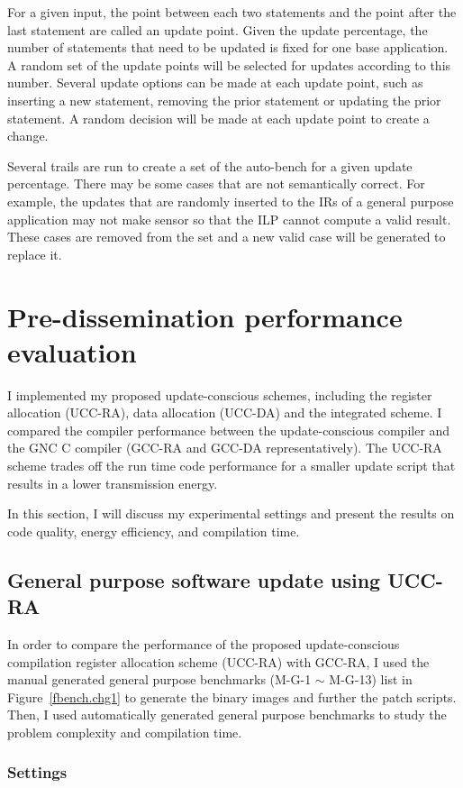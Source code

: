 For a given input, the point between each two statements and the point after the last statement are called an update 
point.
Given the update percentage, the number of statements that need to be updated is fixed
for one base application.
A random set of the update points will be selected for updates according to this number.
Several update options can be made at each update point, such as inserting a new statement,
removing the prior statement or updating the prior statement.
A random decision will be made at each update point to create a change.

Several trails are run to create a set of the auto-bench for a given update percentage.
There may be some cases that are not semantically correct.
For example, the updates that are randomly inserted to the IRs of a general purpose
application may not make sensor so that the ILP cannot compute a valid result.
These cases are removed from the set and a new valid case will be generated to replace it.

\section{Pre-dissemination performance evaluation}
I implemented my proposed update-conscious schemes, including the register allocation
(UCC-RA), data allocation (UCC-DA) and the integrated scheme.
I compared the compiler performance between the update-conscious compiler and 
the GNC C compiler (GCC-RA and GCC-DA representatively). 
The UCC-RA scheme trades off the run time code performance for a smaller update script
that results in a lower transmission energy.

In this
section, I will discuss my experimental settings and present the results
on code quality, energy efficiency, and compilation time.

\subsection{General purpose software update using UCC-RA}\label{exper-ra}

In order to compare the performance of the proposed update-conscious compilation register
allocation scheme (UCC-RA) with GCC-RA, I used the manual generated general purpose 
benchmarks (M-G-1 $\sim$ M-G-13) list in
Figure~\ref{fbench.chg1} to generate the binary images and further the patch scripts.
Then, I used automatically generated general purpose benchmarks to study the
problem complexity and compilation time.
\subsubsection{Settings}

